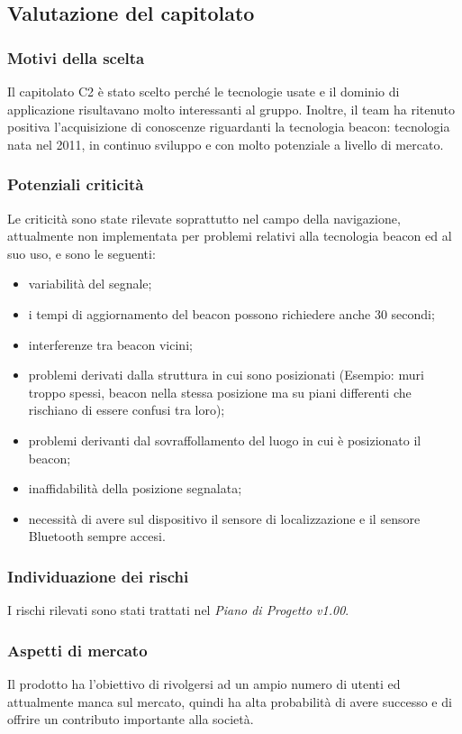 \documentclass[../nStudioDiFattibilita.tex]{subfiles}
\begin{document}
	\subsection{Valutazione del capitolato}
		\subsubsection{Motivi della scelta}
		Il capitolato C2 è stato scelto perché le tecnologie usate e il dominio di applicazione risultavano molto interessanti al gruppo.
		Inoltre, il team ha ritenuto positiva l'acquisizione di conoscenze riguardanti la tecnologia beacon: tecnologia nata nel 2011, in continuo sviluppo e con molto potenziale a livello di mercato.
		\subsubsection{Potenziali criticità}
		Le criticità sono state rilevate soprattutto nel campo della navigazione, attualmente non implementata per problemi relativi alla tecnologia beacon ed al suo uso, e sono le seguenti:
			\begin{itemize}
				\item variabilità del segnale;
				\item i tempi di aggiornamento del beacon possono richiedere anche 30 secondi;
				\item interferenze tra beacon vicini;
				\item problemi derivati dalla struttura in cui sono posizionati (Esempio: muri troppo spessi, beacon nella stessa posizione ma su piani differenti che rischiano di essere confusi tra loro);
				\item problemi derivanti dal sovraffollamento del luogo in cui è posizionato il beacon;
				\item inaffidabilità della posizione segnalata;
				\item necessità di avere sul dispositivo il sensore di localizzazione e il sensore Bluetooth sempre accesi.
			\end{itemize}
		\subsubsection{Individuazione dei rischi}
		I rischi rilevati sono stati trattati nel \textit{Piano di Progetto v1.00}.
		\subsubsection{Aspetti di mercato}
		Il prodotto ha l'obiettivo di rivolgersi ad un ampio numero di utenti ed attualmente manca sul mercato, quindi ha alta probabilità di avere successo e di offrire un contributo importante alla società.
\end{document}
